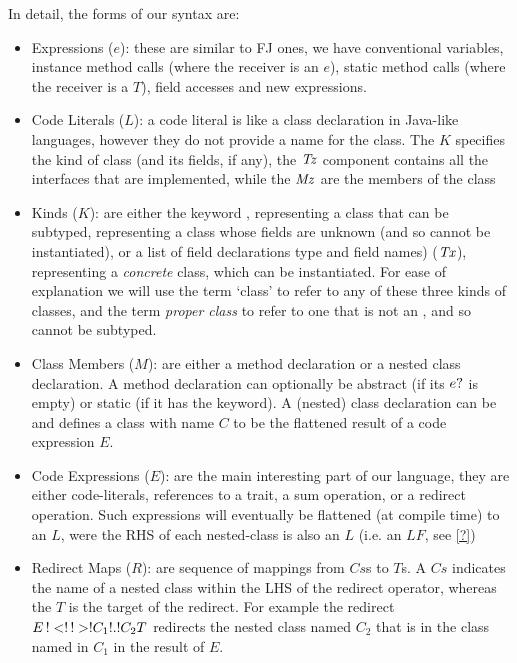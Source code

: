 In detail, the forms of our syntax are:
\begin{itemize}
	\item Expressions ($e$): these are similar to FJ ones, we have conventional variables, instance method calls (where the receiver is an $e$), static method calls (where the receiver is a $T$), field accesses and new expressions.
	
	\item Code Literals ($L$): a code literal is like a class declaration in Java-like languages, however they do not provide a name for the class. The $K$ specifies the kind of class (and its fields, if any), the $\mathit{Tz}$ component contains all the interfaces that are implemented, while the $\mathit{Mz}$ are the members of the class 
	
	\item Kinds ($K$): are either the keyword , representing a class that can be subtyped,  representing a class whose fields are unknown (and so cannot be instantiated), or a list of field declarations type and field names) ($\mathit{Tx}$), representing a \emph{concrete} class, which can be instantiated. For ease of explanation we will use the term `class' to refer to any of these three kinds of classes, and the term \emph{proper class} to refer to one that is not an , and so cannot be subtyped.
	
	\item Class Members ($M$): are either a method declaration or a nested class declaration. A method declaration can optionally be abstract (if its $e?$ is empty) or static (if it has the  keyword). A (nested) class declaration can be  and defines a class with name $C$ to be the flattened result of a code expression $E$.	

	\item Code Expressions ($E$): are the main interesting part of our language, they are either code-literals, references to a trait, a sum operation, or a redirect operation. Such expressions will eventually be flattened (at compile time) to an $L$, were the RHS of each nested-class is also an $L$ (i.e. an $LF$, see \autoref{?})
	\item Redirect Maps ($R$): are sequence of mappings from $Cs$s to $T$s. A $Cs$ indicates the name of a nested class within the LHS of the redirect operator, whereas the $T$ is the target of the redirect. For example the redirect $\red{E}{C_1\.C_2}{T}$ redirects the nested class named $C_2$ that is in the class named in $C_1$ in the result of $E$.
	

\end{itemize}
